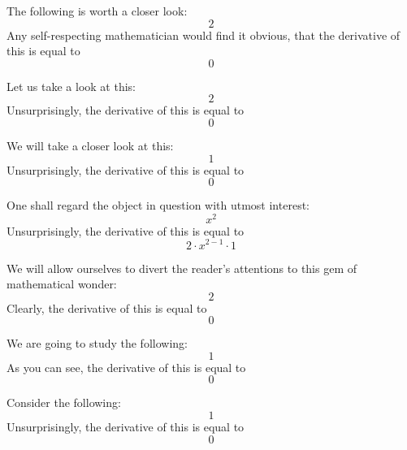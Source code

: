 \documentclass{article}
\begin{document}
The following is worth a closer look:
\begin{equation}
2 
\end{equation}
Any self-respecting mathematician would find it obvious, that the derivative of this is equal to
\begin{equation}
0 
\end{equation}

Let us take a look at this:
\begin{equation}
2 
\end{equation}
Unsurprisingly, the derivative of this is equal to
\begin{equation}
0 
\end{equation}

We will take a closer look at this:
\begin{equation}
1 
\end{equation}
Unsurprisingly, the derivative of this is equal to
\begin{equation}
0 
\end{equation}

One shall regard the object in question with utmost interest:
\begin{equation}
x ^{2 } 
\end{equation}
Unsurprisingly, the derivative of this is equal to
\begin{equation}
2 \cdot x ^{2 - 1 } \cdot 1 
\end{equation}

We will allow ourselves to divert the reader's attentions to this gem of mathematical wonder:
\begin{equation}
2 
\end{equation}
Clearly, the derivative of this is equal to
\begin{equation}
0 
\end{equation}

We are going to study the following:
\begin{equation}
1 
\end{equation}
As you can see, the derivative of this is equal to
\begin{equation}
0 
\end{equation}

Consider the following:
\begin{equation}
1 
\end{equation}
Unsurprisingly, the derivative of this is equal to
\begin{equation}
0 
\end{equation}
\end{document}
